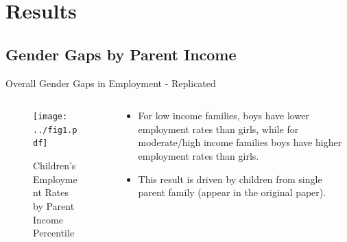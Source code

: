 \documentclass{beamer}
\begin{document}
\section{Results}
\subsection{Gender Gaps by Parent Income}

\begin{frame}{Overall Gender Gaps in Employment - Replicated}
\begin{columns}
	
	\begin{column}{0.52\textwidth}
		\vspace{\topsep}
		\begin{figure}
			\vspace{-0.5cm}	
			\texttt{[image: ../fig1.pdf]}
			\caption{{\scriptsize Children’s Employment Rates by Parent Income Percentile}}
		\end{figure}	
	\end{column}
	
	\begin{column}{0.4\textwidth}
		\vspace{-2.5cm}	
		\begin{itemize}
			\item For low income families, boys have lower employment rates than girls, while for moderate/high income families boys have higher employment rates than girls.
			\item This result is driven by children from single parent family (appear in the original paper).
		\end{itemize}
	\end{column}
	
\end{columns}
\end{frame}
\end{document}
